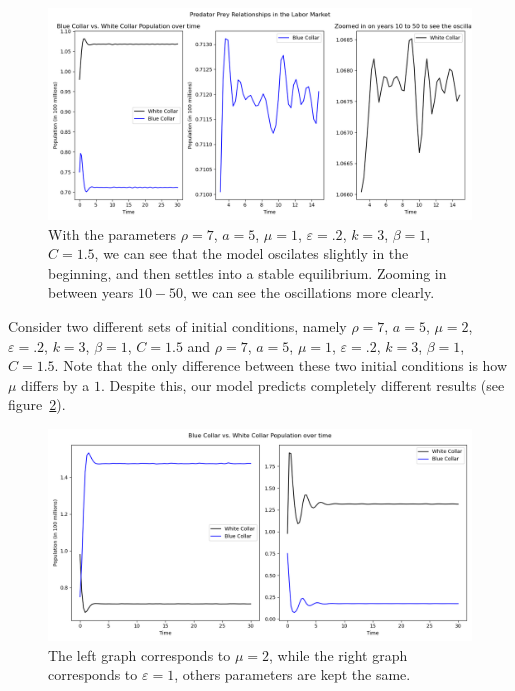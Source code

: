\documentclass[11pt]{amsart}
\begin{document}
\begin{figure}[h]
    \centering
    \includegraphics[width=.8\textwidth]{figures/blue_vs_white2.png}
    \caption{With the parameters $\rho = 7$, $a = 5$, $\mu = 1$, $\varepsilon = .2$, $k = 3$, $\beta = 1$, $C = 1.5$, we can see that the model oscilates
    slightly in the beginning, and then settles into a stable equilibrium. Zooming in between years $10-50$, we can see the oscillations more clearly.}
    \label{fig:results_wb_1}
\end{figure}



Consider two different sets of initial conditions, namely $\rho = 7$, $a = 5$, $\mu = 2$, $\varepsilon = .2$, $k = 3$, $\beta = 1$, $C = 1.5$ and 
$\rho = 7$, $a = 5$, $\mu = 1$, $\varepsilon = .2$, $k = 3$, $\beta = 1$, $C = 1.5$. Note that the only difference between these two initial conditions is
how $\mu$ differs by a $1$. Despite this, our model predicts completely different results (see figure~\ref{fig:results_wb_3}).

\begin{figure}[h]
    \centering
    \includegraphics[width=.8\textwidth]{figures/bad_paramenters.png}
    \caption{The left graph corresponds to $\mu = 2$, while the right graph corresponds to $\varepsilon = 1$, others parameters are kept the same.}
    \label{fig:results_wb_3}
\end{figure}
\end{document}
